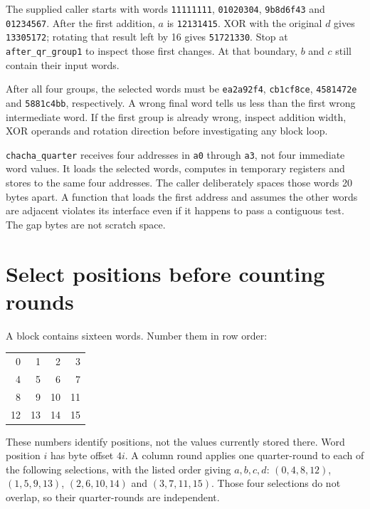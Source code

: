 The supplied caller starts with words \texttt{11111111}, \texttt{01020304},
\texttt{9b8d6f43} and \texttt{01234567}. After the first addition, $a$ is
\texttt{12131415}. XOR with the original $d$ gives \texttt{13305172}; rotating
that result left by 16 gives \texttt{51721330}. Stop at
\texttt{after\_qr\_group1} to inspect those first changes. At that boundary,
$b$ and $c$ still contain their input words.

After all four groups, the selected words must be \texttt{ea2a92f4},
\texttt{cb1cf8ce}, \texttt{4581472e} and \texttt{5881c4bb}, respectively.
A wrong final word tells us less than the first wrong intermediate word.
If the first group is already wrong, inspect addition width, XOR operands and
rotation direction before investigating any block loop.

\texttt{chacha\_quarter} receives four addresses in \texttt{a0} through
\texttt{a3}, not four immediate word values. It loads the selected words,
computes in temporary registers and stores to the same four addresses.
The caller deliberately spaces those words 20 bytes apart. A function that
loads the first address and assumes the other words are adjacent violates its
interface even if it happens to pass a contiguous test. The gap bytes are not
scratch space.



\section{Select positions before counting rounds}

A block contains sixteen words. Number them in row order:

\begin{center}
  \begin{tabular}{rrrr}
    0  & 1  & 2  & 3  \\
    4  & 5  & 6  & 7  \\
    8  & 9  & 10 & 11 \\
    12 & 13 & 14 & 15
  \end{tabular}
\end{center}

These numbers identify positions, not the values currently stored there.
Word position $i$ has byte offset $4i$. A column round applies one quarter-round
to each of the following selections, with the listed order giving $a,b,c,d$:
$(0,4,8,12)$, $(1,5,9,13)$, $(2,6,10,14)$ and $(3,7,11,15)$.
Those four selections do not overlap, so their quarter-rounds are independent.


